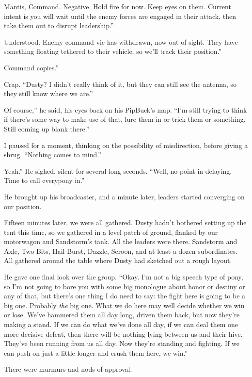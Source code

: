 \leavevmode{}Mantis, Command. Negative. Hold fire for now. Keep eyes on them. Current intent is you will wait until the enemy forces are engaged in their attack, then take them out to disrupt leadership.”

\leavevmode{}Understood. Enemy command vic has withdrawn, now out of sight. They have something floating tethered to their vehicle, so we’ll track their position.”

\leavevmode{}Command copies.”

Crap. “Dusty? I didn’t really think of it, but they can still see the antenna, so they still know where we are.”

\leavevmode{}Of course,” he said, his eyes back on his PipBuck’s map. “I’m still trying to think if there’s some way to make use of that, lure them in or trick them or something. Still coming up blank there.”

I paused for a moment, thinking on the possibility of misdirection, before giving a shrug. “Nothing comes to mind.”

\leavevmode{}Yeah.” He sighed, silent for several long seconds. “Well, no point in delaying. Time to call everypony in.”

He brought up his broadcaster, and a minute later, leaders started converging on our position.

{\br}%
Fifteen minutes later, we were all gathered. Dusty hadn’t bothered setting up the tent this time, so we gathered in a level patch of ground, flanked by our motorwagon and Sandstorm’s tank. All the leaders were there. Sandstorm and Axle, Two Bits, Hail Burst, Dazzle, Seroon, and at least a dozen subordinates. All gathered around the table where Dusty had sketched out a rough layout.

He gave one final look over the group. “Okay. I’m not a big speech type of pony, so I’m not going to bore you with some big monologue about honor or destiny or any of that, but there’s one thing I do need to say: the fight here is going to be a big one. Probably \textit{the} big one. What we do here may well decide whether we win or lose. We’ve hammered them all day long, driven them back, but now they’re making a stand. If we can do what we’ve done all day, if we can deal them one more decisive defeat, then there will be nothing lying between us and their hive. They’ve been running from us all day. Now they’re standing and fighting. If we can push on just a little longer and crush them here, we win.”

There were murmurs and nods of approval.

